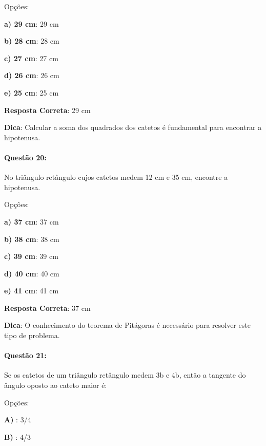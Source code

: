 \documentclass{article}
\begin{document}
\vspace{\baselineskip}Opções:

\vspace{\baselineskip}\textbf{a) 29 cm}: 29 cm 

\textbf{b) 28 cm}: 28 cm 

\textbf{c) 27 cm}: 27 cm 

\textbf{d) 26 cm}: 26 cm 

\textbf{e) 25 cm}: 25 cm 

\vspace{\baselineskip}\textbf{Resposta Correta}: 29 cm

\vspace{\baselineskip}\textbf{Dica}: Calcular a soma dos quadrados dos catetos é fundamental para encontrar a hipotenusa.

\paragraph{Questão 20:}
{No triângulo retângulo cujos catetos medem 12 cm e 35 cm, encontre a hipotenusa.}

\vspace{\baselineskip}Opções:

\vspace{\baselineskip}\textbf{a) 37 cm}: 37 cm 

\textbf{b) 38 cm}: 38 cm 

\textbf{c) 39 cm}: 39 cm 

\textbf{d) 40 cm}: 40 cm 

\textbf{e) 41 cm}: 41 cm 

\vspace{\baselineskip}\textbf{Resposta Correta}: 37 cm

\vspace{\baselineskip}\textbf{Dica}: O conhecimento do teorema de Pitágoras é necessário para resolver este tipo de problema.

\paragraph{Questão 21:}
{Se os catetos de um triângulo retângulo medem 3b e 4b, então a tangente do ângulo oposto ao cateto maior é:}

\vspace{\baselineskip}Opções:

\vspace{\baselineskip}\textbf{A) }: 3/4 

\textbf{B) }: 4/3 
\end{document}
